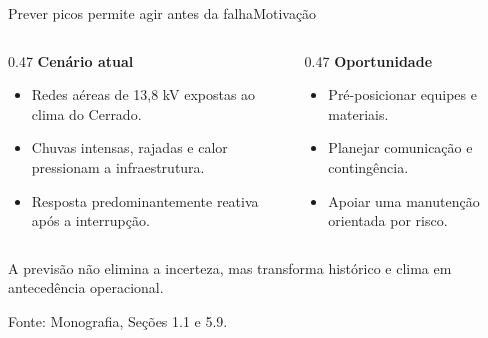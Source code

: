 \documentclass[10pt]{beamer}
\newcommand{\source}[1]{%
  \par\vfill{\raggedleft\tiny\color{gray}Fonte: #1\par}%
}
\begin{document}
\begin{frame}{Prever picos permite agir antes da falha}{Motivação}
  \vspace{0.4em}
  \begin{columns}[T,onlytextwidth]
    \begin{column}{0.47\textwidth}
      \textbf{\large Cenário atual}
      \begin{itemize}
        \item Redes aéreas de 13,8 kV expostas ao clima do Cerrado.
        \item Chuvas intensas, rajadas e calor pressionam a infraestrutura.
        \item Resposta predominantemente reativa após a interrupção.
      \end{itemize}
    \end{column}
    \begin{column}{0.47\textwidth}
      \textbf{\large Oportunidade}
      \begin{itemize}
        \item Pré-posicionar equipes e materiais.
        \item Planejar comunicação e contingência.
        \item Apoiar uma manutenção orientada por risco.
      \end{itemize}
    \end{column}
  \end{columns}

  \vspace{0.8em}
  \begin{block}{}
    \centering
    A previsão não elimina a incerteza, mas transforma histórico e clima em antecedência operacional.
  \end{block}

  \source{Monografia, Seções 1.1 e 5.9.}
\end{frame}
\end{document}
